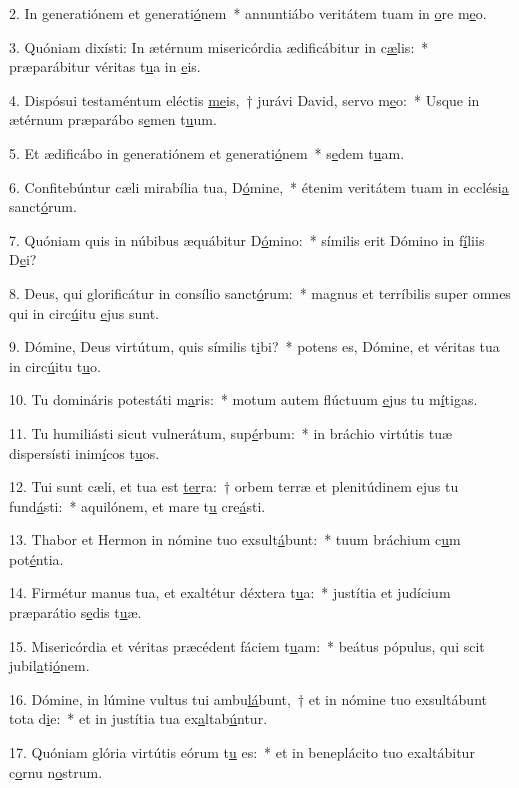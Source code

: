 2. In generatiónem et generati\uline{ó}nem~* annuntiábo veritátem tuam in \uline{o}re m\uline{e}o.\par 
3. Quóniam dixísti: In ætérnum misericórdia ædificábitur in c\uline{æ}lis:~* præparábitur véritas t\uline{u}a in \uline{e}is.\par 
4. Dispósui testaméntum eléctis \uline{me}is,~† jurávi David, servo m\uline{e}o:~* Usque in ætérnum præparábo s\uline{e}men t\uline{u}um.\par 
5. Et ædificábo in generatiónem et generati\uline{ó}nem~* s\uline{e}dem t\uline{u}am.\par 
6. Confitebúntur cæli mirabília tua, D\uline{ó}mine,~* étenim veritátem tuam in ecclési\uline{a} sanct\uline{ó}rum.\par 
7. Quóniam quis in núbibus æquábitur D\uline{ó}mino:~* símilis erit Dómino in f\uline{í}liis D\uline{e}i?\par 
8. Deus, qui glorificátur in consílio sanct\uline{ó}rum:~* magnus et terríbilis super omnes qui in circ\uline{ú}itu \uline{e}jus sunt.\par 
9. Dómine, Deus virtútum, quis símilis t\uline{i}bi?~* potens es, Dómine, et véritas tua in circ\uline{ú}itu t\uline{u}o.\par 
10. Tu domináris potestáti m\uline{a}ris:~* motum autem flúctuum \uline{e}jus tu m\uline{í}tigas.\par 
11. Tu humiliásti sicut vulnerátum, sup\uline{é}rbum:~* in bráchio virtútis tuæ dispersísti inim\uline{í}cos t\uline{u}os.\par 
12. Tui sunt cæli, et tua est \uline{ter}ra:~† orbem terræ et plenitúdinem ejus tu fund\uline{á}sti:~* aquilónem, et mare t\uline{u} cre\uline{á}sti.\par 
13. Thabor et Hermon in nómine tuo exsult\uline{á}bunt:~* tuum bráchium c\uline{u}m pot\uline{é}ntia.\par 
14. Firmétur manus tua, et exaltétur déxtera t\uline{u}a:~* justítia et judícium præparátio s\uline{e}dis t\uline{u}æ.\par 
15. Misericórdia et véritas præcédent fáciem t\uline{u}am:~* beátus pópulus, qui scit jubil\uline{a}ti\uline{ó}nem.\par 
16. Dómine, in lúmine vultus tui ambu\uline{lá}bunt,~† et in nómine tuo exsultábunt tota d\uline{i}e:~* et in justítia tua ex\uline{a}ltab\uline{ú}ntur.\par 
17. Quóniam glória virtútis eórum t\uline{u} es:~* et in beneplácito tuo exaltábitur c\uline{o}rnu n\uline{o}strum.\par 
